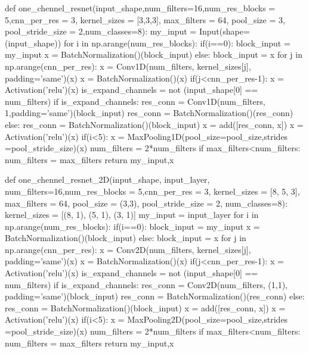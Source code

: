\begin{python}
def one_chennel_resnet(input_shape,num_filters=16,num_res_blocks = 5,cnn_per_res = 3,
                        kernel_sizes = [3,3,3], max_filters = 64, pool_size = 3,
                        pool_stride_size = 2,num_classes=8):
    my_input  = Input(shape=(input_shape))
    for i in np.arange(num_res_blocks):
        if(i==0):
            block_input = my_input
            x = BatchNormalization()(block_input)
        else:
            block_input = x
        for j in np.arange(cnn_per_res):
            x = Conv1D(num_filters, kernel_sizes[j], padding='same')(x)
            x = BatchNormalization()(x)
            if(j<cnn_per_res-1):
                x = Activation('relu')(x)
        is_expand_channels = not (input_shape[0] == num_filters)
        if is_expand_channels:
            res_conn = Conv1D(num_filters, 1,padding='same')(block_input)
            res_conn = BatchNormalization()(res_conn)
        else:
            res_conn = BatchNormalization()(block_input)
        x = add([res_conn, x])
        x = Activation('relu')(x)
        if(i<5):
            x = MaxPooling1D(pool_size=pool_size,strides =pool_stride_size)(x)
        num_filters = 2*num_filters
        if max_filters<num_filters:
            num_filters = max_filters
    return my_input,x


def one_chennel_resnet_2D(input_shape, input_layer, num_filters=16,num_res_blocks = 5,cnn_per_res = 3,
                        kernel_sizes = [8, 5, 3], max_filters = 64, pool_size = (3,3),
                        pool_stride_size = 2, num_classes=8):
    kernel_sizes = [(8, 1), (5, 1), (3, 1)]
    my_input = input_layer
    for i in np.arange(num_res_blocks):
        if(i==0):
            block_input = my_input
            x = BatchNormalization()(block_input)
        else:
            block_input = x
        for j in np.arange(cnn_per_res):
            x = Conv2D(num_filters, kernel_sizes[j], padding='same')(x)
            x = BatchNormalization()(x)
            if(j<cnn_per_res-1):
                x = Activation('relu')(x)
        is_expand_channels = not (input_shape[0] == num_filters)
        if is_expand_channels:
            res_conn = Conv2D(num_filters, (1,1), padding='same')(block_input)
            res_conn = BatchNormalization()(res_conn)
        else:
            res_conn = BatchNormalization()(block_input)
        x = add([res_conn, x])
        x = Activation('relu')(x)
        if(i<5):
            x = MaxPooling2D(pool_size=pool_size,strides =pool_stride_size)(x)
        num_filters = 2*num_filters
        if max_filters<num_filters:
            num_filters = max_filters
    return my_input,x



\end{python}
